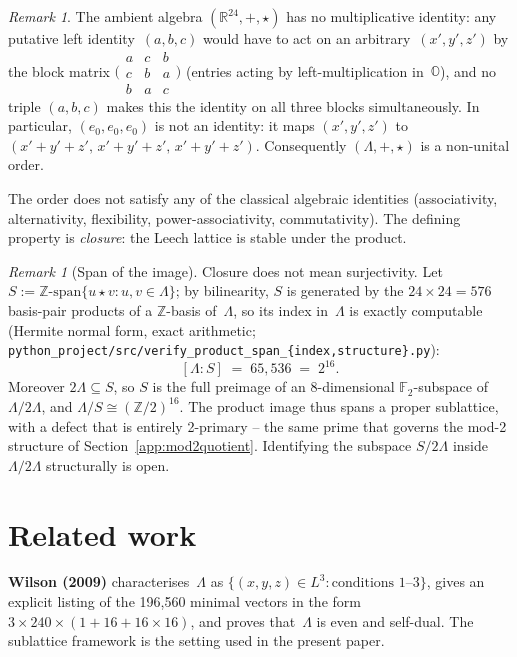 \documentclass[twoside,english]{paper}
\numberwithin{equation}{section}
\numberwithin{figure}{section}
\theoremstyle{definition}
\theoremstyle{remark}
\newtheorem{remark}[theorem]{Remark}
\newcommand{\OO}{\mathbb{O}}          %
\newcommand{\RR}{\mathbb{R}}
\newcommand{\ZZ}{\mathbb{Z}}
\newcommand{\FF}{\mathbb{F}}
\newcommand{\LL}{\Lambda}             %
\begin{document}
\begin{remark}
The ambient algebra $(\RR^{24}, +, \star)$ has no multiplicative
identity: any putative left identity~$(a,b,c)$ would have to act on
an arbitrary~$(x',y',z')$ by the block matrix
$\bigl(\begin{smallmatrix} a & c & b \\ c & b & a \\ b & a & c
\end{smallmatrix}\bigr)$ (entries acting by left-multiplication
in~$\OO$), and no triple $(a,b,c)$ makes this the identity on all
three blocks simultaneously.  In particular, $(e_0, e_0, e_0)$ is
not an identity: it maps $(x', y', z')$ to $(x'+y'+z',\, x'+y'+z',\,
x'+y'+z')$.  Consequently $(\LL, +, \star)$ is a non-unital order.
\end{remark}

The order does not satisfy any of the classical algebraic identities
(associativity, alternativity, flexibility, power-associativity,
commutativity).  The defining property is \emph{closure}: the Leech
lattice is stable under the product.

\begin{remark}[Span of the image]\label{rem:span-defect}
Closure does not mean surjectivity.  Let $S :=
\ZZ\text{-span}\{u \star v : u, v \in \LL\}$; by bilinearity, $S$ is
generated by the $24 \times 24 = 576$ basis-pair products of a
$\ZZ$-basis of~$\LL$, so its index in~$\LL$ is exactly computable
(Hermite normal form, exact arithmetic;
\texttt{python\_project/src/verify\_product\_span\_\{index,structure\}.py}):
\[
  [\LL : S] \;=\; 65{,}536 \;=\; 2^{16}.
\]
Moreover $2\LL \subseteq S$, so $S$ is the full preimage of an
8-dimensional $\FF_2$-subspace of $\LL/2\LL$, and $\LL/S \cong
(\ZZ/2)^{16}$.  The product image thus spans a proper sublattice,
with a defect that is entirely 2-primary -- the same prime that
governs the mod-2 structure of Section~\ref{app:mod2quotient}.
Identifying the subspace $S/2\LL$ inside $\LL/2\LL$ structurally is
open.
\end{remark}

\section{Related work}\label{sec:related}

\textbf{Wilson (2009)} \cite{Wilson2009} characterises~$\LL$ as
$\{(x,y,z) \in L^3 : \text{conditions 1--3}\}$, gives an explicit
listing of the 196{,}560 minimal vectors in the form
$3 \times 240 \times (1 + 16 + 16 \times 16)$, and proves that~$\LL$
is even and self-dual.  The sublattice framework is
the setting used in the present paper.
\end{document}
